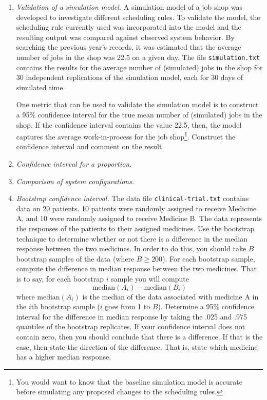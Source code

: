 \begin{enumerate}
\item \emph{Validation of a simulation model.} A simulation model of a
  job shop was developed to investigate different scheduling rules. To
  validate the model, the scheduling rule currently used was
  incorporated into the model and the resulting output was compared
  against observed system behavior. By searching the previous year’s
  records, it was estimated that the average number of jobs in the
  shop was 22.5 on a given day. The file \texttt{simulation.txt} contains the 
  results for the average number of (simulated) jobs in the shop for 30 independent 
  replications of the simulation model, each for 30 days of simulated time.

  One metric that can be used to validate the simulation model is to
  construct a 95\% confidence interval for the true mean number of
  (simulated) jobs in the shop. If the confidence interval
  contains the value 22.5, then, the model captures the average
  work-in-process for the job shop\footnote{You would want to know that the
  baseline simulation model is accurate before simulating any proposed
  changes to the scheduling rules.}. Construct the confidence interval
  and comment on the result.

\item \emph{Confidence interval for a proportion.} 

\item \emph{Comparison of system configurations.}


\item \emph{Bootstrap confidence interval.} The data file
  \texttt{clinical-trial.txt} contains data on 20 patients. 10
  patients were randomly assigned to receive Medicine A, and 10 were
  randomly assigned to receive Medicine B. The data represents the
  responses of the patients to their assigned medicines. Use the
  bootstrap technique to determine whether or not there is a
  difference in the median response between the two medicines.  In
  order to do this, you should take $B$ bootstrap samples of the data
  (where $B \geq 200$). For each bootstrap sample, compute the
  difference in median response between the two medicines. That is to
  say, for each bootstrap $i$ sample you will compute
  \[
  \text{median}(A_i) - \text{median}(B_i)
  \]
  where $\text{median}(A_i)$ is the median of the data associated with
  medicine A in the $i$th bootstrap sample ($i$ goes from 1 to
  $B$). Determine a 95\% confidence interval for the difference in
  median response by taking the .025 and .975 quantiles of the
  bootstrap replicates. If your confidence interval does not contain
  zero, then you should conclude that there is a difference. If that
  is the case, then state the direction of the difference. That is,
  state which medicine has a higher median response. \label{ex:boot}



\end{enumerate}

